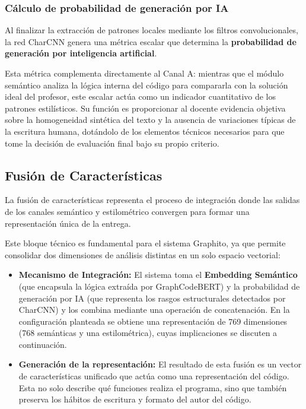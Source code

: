 \subsubsection{Cálculo de probabilidad de generación por IA}

Al finalizar la extracción de patrones locales mediante los filtros convolucionales, la red CharCNN genera una métrica escalar que determina la \textbf{probabilidad de generación por inteligencia artificial}.

Esta métrica complementa directamente al Canal A: mientras que el módulo semántico analiza la lógica interna del código para compararla con la solución ideal del profesor, este escalar actúa como un indicador cuantitativo de los patrones estilísticos. Su función es proporcionar al docente evidencia objetiva sobre la homogeneidad sintética del texto y la ausencia de variaciones típicas de la escritura humana, dotándolo de los elementos técnicos necesarios para que tome la decisión de evaluación final bajo su propio criterio.
\subsection{Fusión de Características}
\label{subsec:fusion_caracteristicas}

La fusión de características \cite{MartinezGil2026Improving} representa el proceso de integración donde las salidas de los canales semántico y estilométrico convergen para formar una representación única de la entrega.

Este bloque técnico es fundamental para el sistema Graphito, ya que permite consolidar dos dimensiones de análisis distintas en un solo espacio vectorial:

\begin{itemize}
	\item \textbf{Mecanismo de Integración:} El sistema toma el \textbf{Embedding Semántico} (que encapsula la lógica extraída por GraphCodeBERT) y la probabilidad de generación por IA (que representa los rasgos estructurales detectados por CharCNN) y los combina mediante una operación de concatenación. En la configuración planteada se obtiene una representación de 769 dimensiones (768 semánticas y una estilométrica), cuyas implicaciones se discuten a continuación.

	\item \textbf{Generación de la representación:} El resultado de esta fusión es un vector de características unificado que actúa como una representación del código. Esta no solo describe qué funciones realiza el programa, sino que también preserva los hábitos de escritura y formato del autor del código.
\end{itemize}

